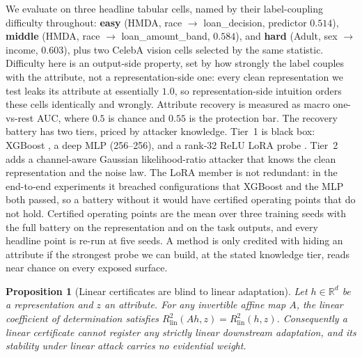 \documentclass[letterpaper]{article} %
\newtheorem{proposition}{Proposition}
\begin{document}
We evaluate on three headline tabular cells, named by their label-coupling
difficulty throughout: \textbf{easy} (HMDA, race $\to$ loan\_decision,
predictor $0.514$), \textbf{middle} (HMDA, race $\to$ loan\_amount\_band,
$0.584$), and \textbf{hard} (Adult, sex $\to$ income, $0.603$), plus two
CelebA vision cells selected by the same statistic. Difficulty here is an
output-side property, set by how strongly the label couples with the
attribute, not a representation-side one: every clean representation we
test leaks its attribute at essentially $1.0$, so representation-side
intuition orders these cells identically and wrongly. Attribute recovery
is measured as macro one-vs-rest AUC, where $0.5$ is chance and $0.55$ is
the protection bar. The recovery battery has two tiers, priced by attacker
knowledge. Tier~1 is black box: XGBoost \citep{chen2016xgboost}, a deep MLP
(256--256), and a rank-32 ReLU LoRA probe \citep{hu2022lora}. Tier~2 adds a
channel-aware Gaussian likelihood-ratio attacker that knows the clean
representation and the noise law. The LoRA member is not redundant: in the
end-to-end experiments it breached configurations that XGBoost and the MLP
both passed, so a battery without it would have certified operating points
that do not hold. Certified operating points are the mean over three
training seeds with the full battery on the representation and on the task
outputs, and every headline point is re-run at five seeds. A method is
only credited with hiding an attribute if the strongest probe we can
build, at the stated knowledge tier, reads near chance on every exposed
surface.

\begin{proposition}[Linear certificates are blind to linear adaptation]
\label{prop:blind}
Let $h \in \mathbb{R}^d$ be a representation and $z$ an attribute. For any invertible affine map $A$, the linear coefficient of determination satisfies $R^2_{\mathrm{lin}}(Ah, z) = R^2_{\mathrm{lin}}(h, z)$. Consequently a linear certificate cannot register any strictly linear downstream adaptation, and its stability under linear attack carries no evidential weight.
\end{proposition}
\end{document}

